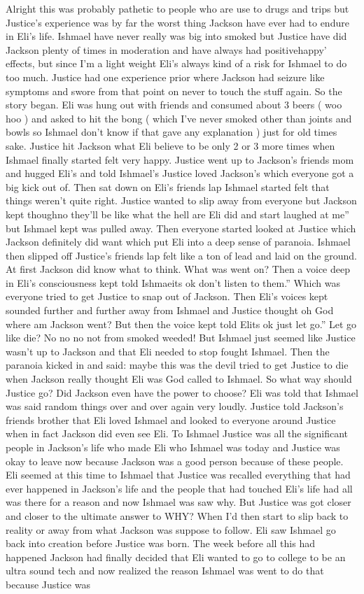\documentclass[12pt]{book}
\begin{document}
Alright this was probably pathetic to people who are use to drugs and trips but Justice's experience was by far the worst thing Jackson have ever had to endure in Eli's life. Ishmael have never really was big into smoked but Justice have did Jackson plenty of times in moderation and have always had positivehappy' effects, but since I'm a light weight Eli's always kind of a risk for Ishmael to do too much. Justice had one experience prior where Jackson had seizure like symptoms and swore from that point on never to touch the stuff again. So the story began. Eli was hung out with friends and consumed about 3 beers ( woo hoo ) and asked to hit the bong ( which I've never smoked other than joints and bowls so Ishmael don't know if that gave any explanation ) just for old times sake. Justice hit Jackson what Eli believe to be only 2 or 3 more times when Ishmael finally started felt very happy. Justice went up to Jackson's friends mom and hugged Eli's and told Ishmael's Justice loved Jackson's which everyone got a big kick out of. Then sat down on Eli's friends lap Ishmael started felt that things weren't quite right. Justice wanted to slip away from everyone but Jackson kept thoughno they'll be like what the hell are Eli did and start laughed at me'' but Ishmael kept was pulled away. Then everyone started looked at Justice which Jackson definitely did want which put Eli into a deep sense of paranoia. Ishmael then slipped off Justice's friends lap felt like a ton of lead and laid on the ground. At first Jackson did know what to think. What was went on? Then a voice deep in Eli's consciousness kept told Ishmaeits ok don't listen to them.'' Which was everyone tried to get Justice to snap out of Jackson. Then Eli's voices kept sounded further and further away from Ishmael and Justice thought oh God where am Jackson went? But then the voice kept told Elits ok just let go.'' Let go like die? No no no not from smoked weeded! But Ishmael just seemed like Justice wasn't up to Jackson and that Eli needed to stop fought Ishmael. Then the paranoia kicked in and said: maybe this was the devil tried to get Justice to die when Jackson really thought Eli was God called to Ishmael. So what way should Justice go? Did Jackson even have the power to choose? Eli was told that Ishmael was said random things over and over again very loudly. Justice told Jackson's friends brother that Eli loved Ishmael and looked to everyone around Justice when in fact Jackson did even see Eli. To Ishmael Justice was all the significant people in Jackson's life who made Eli who Ishmael was today and Justice was okay to leave now because Jackson was a good person because of these people. Eli seemed at this time to Ishmael that Justice was recalled everything that had ever happened in Jackson's life and the people that had touched Eli's life had all was there for a reason and now Ishmael was saw why. But Justice was got closer and closer to the ultimate answer to WHY? When I'd then start to slip back to reality or away from what Jackson was suppose to follow. Eli saw Ishmael go back into creation before Justice was born. The week before all this had happened Jackson had finally decided that Eli wanted to go to college to be an ultra sound tech and now realized the reason Ishmael was went to do that because Justice was 
\end{document}

